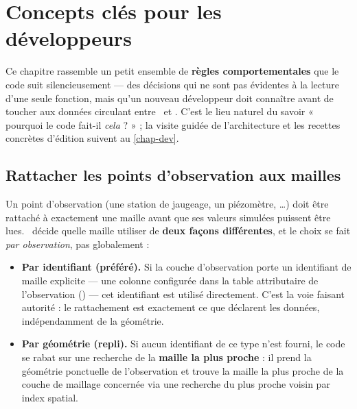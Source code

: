 \chapter{Concepts clés pour les développeurs}
\label{chap-key-concepts}

\renewcommand{\headrulewidth}{0.3pt}
\fancyhead[LE]{\thepage} \fancyhead[RE]{\nouppercase{\textbf{\leftmark}}}
\fancyhead[RO]{\thepage} \fancyhead[LO]{\nouppercase{\textbf{\rightmark}}}
\fancyfoot[L,C,R]{}

\setlength{\parindent}{0.35cm}

\minitoc
\newpage

Ce chapitre rassemble un petit ensemble de \textbf{règles comportementales} que le code suit silencieusement --- des décisions qui ne sont pas évidentes à la lecture d'une seule fonction, mais qu'un nouveau développeur doit connaître avant de toucher aux données circulant entre \cawaqs~et \cwv. C'est le lieu naturel du savoir « pourquoi le code fait-il \emph{cela} ? » ; la visite guidée de l'architecture et les recettes concrètes d'édition suivent au \cref{chap-dev}.

\section{Rattacher les points d'observation aux mailles}
\label{sec-obs-coupling}

Un point d'observation (une station de jaugeage, un piézomètre, \ldots) doit être rattaché à exactement une maille avant que ses valeurs simulées puissent être lues. \cwv~décide quelle maille utiliser de \textbf{deux façons différentes}, et le choix se fait \emph{par observation}, pas globalement :

\begin{itemize}
    \item \textbf{Par identifiant (préféré).} Si la couche d'observation porte un identifiant de maille explicite --- une colonne  configurée dans la table attributaire de l'observation () --- cet identifiant est utilisé directement. C'est la voie faisant autorité : le rattachement est exactement ce que déclarent les données, indépendamment de la géométrie.

    \item \textbf{Par géométrie (repli).} Si aucun identifiant de ce type n'est fourni, le code se rabat sur une recherche de la \textbf{maille la plus proche} : il prend la géométrie ponctuelle de l'observation et trouve la maille la plus proche de la couche de maillage concernée via une recherche du plus proche voisin par index spatial.
\end{itemize}

